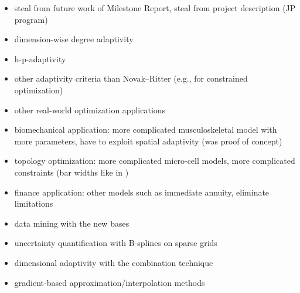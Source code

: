 \begin{itemize}
  \item
  steal from future work of Milestone Report,
  steal from project description (JP program)
  
  \item
  dimension-wise degree adaptivity
  
  \item
  h-p-adaptivity
  
  \item
  other adaptivity criteria than Novak--Ritter
  (e.g., for constrained optimization)
  
  \item
  other real-world optimization applications
  
  \item
  biomechanical application: more complicated musculoskeletal model
  with more parameters, have to exploit spatial adaptivity
  (was proof of concept)
  
  \item
  topology optimization: more complicated micro-cell models,
  more complicated constraints (bar widths like in \cite{Allaire16Towards})
  
  \item
  finance application: other models such as immediate annuity,
  eliminate limitations
  
  \item
  data mining with the new bases
  
  \item
  uncertainty quantification with B-splines on sparse grids
  
  \item
  dimensional adaptivity with the combination technique
  
  \item
  gradient-based approximation/interpolation methods
  \cite{Baar15Gradient}
\end{itemize}

\dummytext[2]{}

\cleardoublepage
